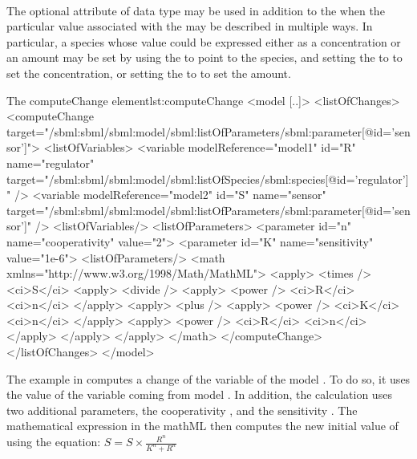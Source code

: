 \begin{blockChanged}
\paragraph*{}
\label{sec:cc_symbol}
The optional  attribute of data type  may be used in addition to the  when the particular value associated with the  may be described in multiple ways.  In particular, a species whose value could be expressed either as a concentration or an amount may be set by using the  to point to the species, and setting the  to  to set the concentration, or setting the  to  to set the amount.
\end{blockChanged}


\begin{myXmlLst}{The computeChange element}{lst:computeChange}
<model [..]>
	<listOfChanges>
	<computeChange target="/sbml:sbml/sbml:model/sbml:listOfParameters/sbml:parameter[@id='sensor']">
		<listOfVariables>
			<variable modelReference="model1" id="R" name="regulator" 
				target="/sbml:sbml/sbml:model/sbml:listOfSpecies/sbml:species[@id='regulator']" />
			<variable modelReference="model2" id="S" name="sensor"
				target="/sbml:sbml/sbml:model/sbml:listOfParameters/sbml:parameter[@id='sensor']" />
		<listOfVariables/>
		<listOfParameters>
			<parameter id="n" name="cooperativity" value="2">
			<parameter id="K" name="sensitivity" value="1e-6">
		<listOfParameters/>
		<math  xmlns="http://www.w3.org/1998/Math/MathML">
        <apply>
          <times />
          <ci>S</ci>
          <apply>
            <divide />
            <apply>
              <power />
              <ci>R</ci>
              <ci>n</ci>
            </apply>
            <apply>
              <plus />
              <apply>
                <power />
                <ci>K</ci>
                <ci>n</ci>
              </apply>
              <apply>
                <power />
                <ci>R</ci>
                <ci>n</ci>
              </apply>
            </apply> 
		</apply>
		</math>
	</computeChange>
	</listOfChanges>
</model>
\end{myXmlLst}

The example in  computes a change of the variable  of the model . To do so, it uses the value of the variable  coming from model . In addition, the calculation uses two additional parameters, the cooperativity , and the sensitivity . The mathematical expression in the mathML then computes the new initial value of  using the equation:
\begin{math}
S =  S \times \frac{R^{n}}{K^{n}+R^{n}}
\end{math}
